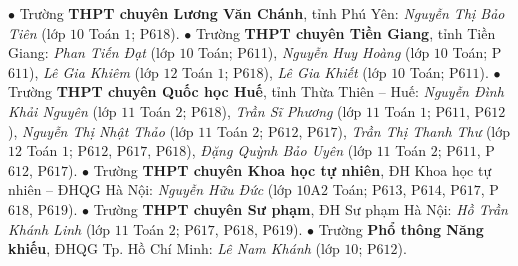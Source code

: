 \begin{multicols}{2}
	\vskip 0.05cm
	$\bullet$ Trường \textbf{\color{thachthuctoanhoc}THPT chuyên Lương Văn Chánh}, tỉnh Phú Yên: \textit{Nguyễn Thị Bảo Tiên} (lớp $10$ Toán $1$; P$618$).
	\vskip 0.05cm
	$\bullet$ Trường \textbf{\color{thachthuctoanhoc}THPT chuyên Tiền Giang}, tỉnh Tiền Giang: \textit{Phan Tiến Đạt} (lớp $10$ Toán; P$61$1), \textit{Nguyễn Huy Hoàng} (lớp $10$ Toán; P$611$), \textit{Lê Gia Khiêm} (lớp $12$ Toán $1$; P$618$), \textit{Lê Gia Khiết} (lớp $10$ Toán; P$611$).
	\vskip 0.05cm
	$\bullet$ Trường \textbf{\color{thachthuctoanhoc}THPT chuyên Quốc học Huế}, tỉnh Thừa Thiên -- Huế: \textit{Nguyễn Đình Khải Nguyên} (lớp $11$ Toán $2$; P$618$), \textit{Trần Sĩ Phương} (lớp $11$ Toán $1$; P$611$, P$612$), \textit{Nguyễn Thị Nhật Thảo} (lớp $11$ Toán $2$; P$612$, P$617$), \textit{Trần Thị Thanh Thư} (lớp $12$ Toán $1$; P$612$, P$617$, P$618$), \textit{Đặng Quỳnh Bảo Uyên} (lớp $11$ Toán $2$; P$611$, P$612$, P$617$).
	\vskip 0.05cm
	$\bullet$ Trường \textbf{\color{thachthuctoanhoc}THPT chuyên Khoa học tự nhiên}, ĐH Khoa học tự nhiên -- ĐHQG Hà Nội: \textit{Nguyễn Hữu Đức} (lớp $10$A$2$ Toán; P$613$, P$614$, P$617$, P$618$, P$619$).
	\vskip 0.05cm
	$\bullet$ Trường \textbf{\color{thachthuctoanhoc}THPT chuyên Sư phạm}, ĐH Sư phạm Hà Nội: \textit{Hồ Trần Khánh Linh} (lớp $11$ Toán $2$; P$617$, P$618$, P$619$).
	\vskip 0.05cm
	$\bullet$ Trường \textbf{\color{thachthuctoanhoc}Phổ thông Năng khiếu}, ĐHQG Tp. Hồ Chí Minh: \textit{Lê Nam Khánh} (lớp $10$; P$612$).
\end{multicols}
